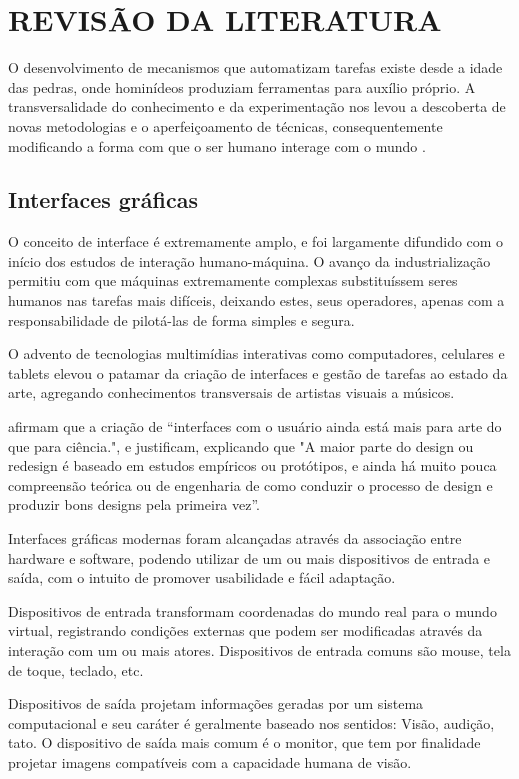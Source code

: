\chapter{REVISÃO DA LITERATURA}

O desenvolvimento de mecanismos que automatizam tarefas existe desde a idade das
pedras, onde hominídeos produziam ferramentas para auxílio próprio. A
transversalidade do conhecimento e da experimentação nos levou a descoberta de
novas metodologias e o aperfeiçoamento de técnicas, consequentemente modificando
a forma com que o ser humano interage com o mundo \cite[p.
1]{sartori2010neurociencia}.

\section{Interfaces gráficas}

O conceito de interface é extremamente amplo, e foi largamente difundido com o
início dos estudos de interação humano-máquina. O avanço da industrialização
permitiu com que máquinas extremamente complexas substituíssem seres humanos nas
tarefas mais difíceis, deixando estes, seus operadores, apenas com a
responsabilidade de pilotá-las de forma simples e segura.

O advento de tecnologias multimídias interativas como computadores, celulares e
tablets elevou o patamar da criação de interfaces e gestão de tarefas ao estado
da arte, agregando conhecimentos transversais de artistas visuais a músicos.

 afirmam que a criação de “interfaces
com o usuário ainda está mais para arte do que para ciência.", e justificam,
explicando que "A maior parte do design ou redesign é baseado em estudos
empíricos ou protótipos, e ainda há muito pouca compreensão teórica ou de
engenharia de como conduzir o processo de design e produzir bons designs pela
primeira vez”.

Interfaces gráficas modernas foram alcançadas através da associação entre
hardware e software, podendo utilizar de um ou mais dispositivos de entrada e
saída, com o intuito de promover usabilidade e fácil adaptação.

Dispositivos de entrada transformam coordenadas do mundo real para o mundo
virtual, registrando condições externas que podem ser modificadas através da
interação com um ou mais atores. Dispositivos de entrada comuns são mouse, tela
de toque, teclado, etc.

Dispositivos de saída projetam informações geradas por um sistema computacional
e seu caráter é geralmente baseado nos sentidos: Visão, audição, tato. O
dispositivo de saída mais comum é o monitor, que tem por finalidade projetar
imagens compatíveis com a capacidade humana de visão.

